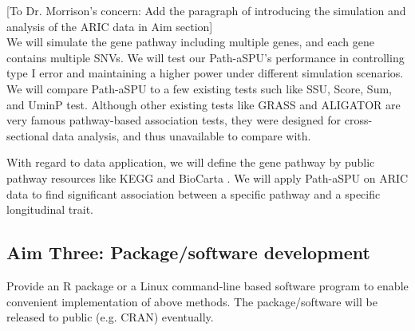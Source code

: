 \documentclass[12pt]{article}
\begin{document}
[To Dr. Morrison's concern: Add the paragraph of introducing the simulation and analysis of the ARIC data in Aim section]\\
We will simulate the gene pathway including multiple genes, and each gene contains multiple SNVs. We will test our Path-aSPU's performance in controlling type I error and maintaining a higher power under different simulation scenarios. We will compare Path-aSPU to a few existing tests such like SSU, Score, Sum, and UminP test. Although other existing tests like GRASS \cite{Chen2010} and ALIGATOR \cite{Holmans2009} are very famous pathway-based association tests, they were designed for cross-sectional data analysis, and thus unavailable to compare with.

With regard to data application, we will define the gene pathway by public pathway resources like KEGG \cite{Ogata1999} and BioCarta \cite{Nishimura2001}. We will apply Path-aSPU on ARIC data to find significant association between a specific pathway and a specific longitudinal trait.
\subsection{Aim Three: Package/software development}
Provide an R package or a Linux command-line based software program to enable convenient implementation of above methods. The package/software will be released to public (e.g. CRAN) eventually.

\newpage
\end{document}
